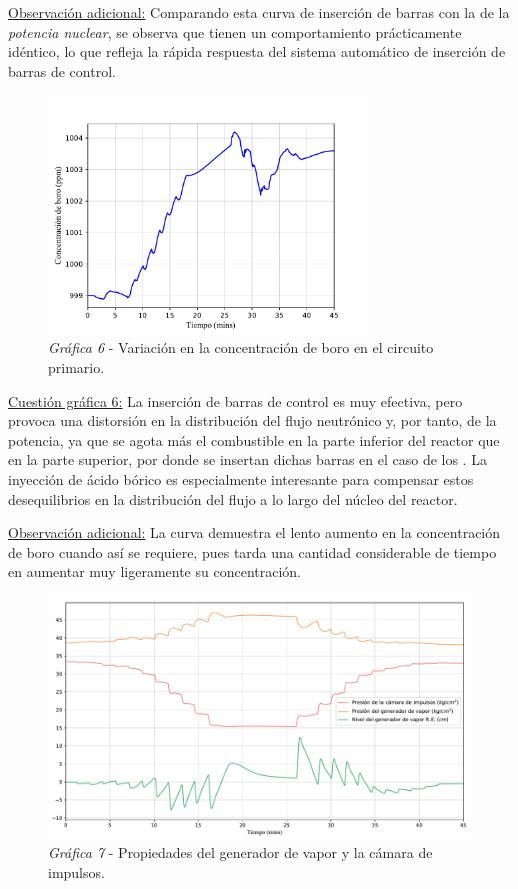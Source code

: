 \underline{Observación adicional:} Comparando esta curva de inserción de barras con la de la \textit{potencia nuclear}, se observa que tienen un comportamiento prácticamente idéntico, lo que refleja la rápida respuesta del sistema automático de inserción de barras de control.

\begin{figure}[h]
  \centering
  \includegraphics[width=0.75\textwidth]{content/figures/sim1_boro.pdf}
  \caption{\textit{Gráfica 6} - Variación en la concentración de boro en el circuito primario.}
  \label{fig:sim1_boro}
\end{figure}

\underline{Cuestión gráfica 6:} La inserción de barras de  control es muy efectiva, pero provoca una distorsión en la distribución del flujo neutrónico y, por tanto, de la potencia, ya que se agota más el combustible en la parte inferior del reactor que en la parte superior, por donde se insertan dichas barras en el caso de los . La inyección de ácido bórico es especialmente interesante para compensar estos desequilibrios en la distribución del flujo a lo largo del núcleo del reactor.

\underline{Observación adicional:} La curva demuestra el lento aumento en la concentración de boro cuando así se requiere, pues tarda una cantidad considerable de tiempo en aumentar muy ligeramente su concentración.

\begin{figure}[!h]
  \centering
  \includegraphics[width=\textwidth]{content/figures/sim1_gen_vapor_camara_imp.pdf}
  \caption{\textit{Gráfica 7} - Propiedades del generador de vapor y la cámara de impulsos.}
  \label{fig:sim1_gen_vapor_camara_imp}
\end{figure}

